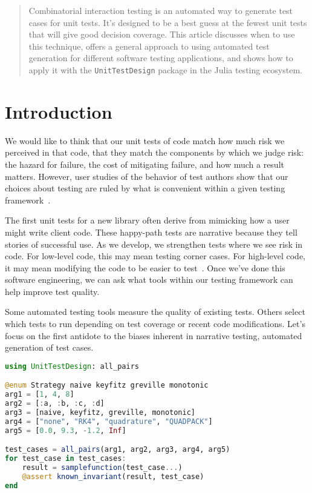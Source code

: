 \documentclass{juliacon}
\newcommand{\utd}{\texttt{UnitTestDesign}\xspace}
\begin{document}


\maketitle

\begin{abstract}
Combinatorial interaction testing is an automated way to generate test cases for unit tests. It's designed to be a best guess at the fewest unit tests that will give good decision coverage. This article discusses when to use this technique, offers a general approach to using automated test generation for different software testing applications, and shows how to apply it with the \utd package in the Julia testing ecosystem.
\end{abstract}

\section{Introduction}

We would like to think that our unit tests of code match how much risk we perceived in that code, that they match the components by which we judge risk: the hazard for failure, the cost of mitigating failure, and how much a result matters. However, user studies of the behavior of test authors show that our choices about testing are ruled by what is convenient within a given testing framework~\cite{Wiklund2017-ms}.

\vskip 6pt
The first unit tests for a new library often derive from mimicking how a user might write client code. These happy-path tests are narrative because they tell stories of successful use. As we develop, we strengthen tests where we see risk in code. For low-level code, this may mean testing corner cases. For high-level code, it may mean modifying the code to be easier to test~\cite{chowdhary2009practicing}. Once we've done this software engineering, we can ask what tools within our testing framework can help improve test quality.

\vskip 6pt
Some automated testing tools measure the quality of existing tests. Others select which tests to run depending on test coverage or recent code modifications. Let's focus on the first antidote to the biases inherent in narrative testing, automated generation of test cases.

\begin{lstlisting}[language=Julia]
using UnitTestDesign: all_pairs

@enum Strategy naive keyfitz greville monotonic
arg1 = [1, 4, 8]
arg2 = [:a, :b, :c, :d]
arg3 = [naive, keyfitz, greville, monotonic]
arg4 = ["none", "RK4", "quadrature", "QUADPACK"]
arg5 = [0.0, 9.3, -1.2, Inf]

test_cases = all_pairs(arg1, arg2, arg3, arg4, arg5)
for test_case in test_cases:
    result = samplefunction(test_case...)
    @assert known_invariant(result, test_case)
end
\end{lstlisting}
\end{document}
